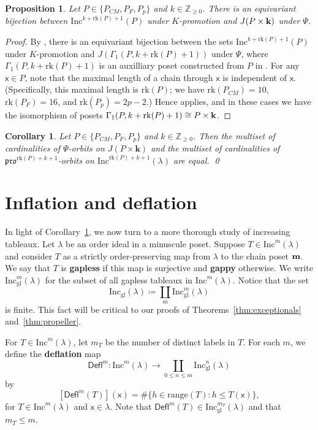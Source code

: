\documentclass[12pt]{amsart}
\newcommand{\x}{\ensuremath{\mathsf{x}}}
\newtheorem{proposition}[theorem]{Proposition}
\newtheorem{corollary}[theorem]{Corollary}
\theoremstyle{definition}
\theoremstyle{remark}
\numberwithin{equation}{section}
\newcommand{\inc}{\ensuremath{\mathrm{Inc}}}
\newcommand{\incgl}{\inc_{\mathrm{gl}}}
\newcommand{\pro}{\mathfrak{pro}}
\newcommand{\rank}{\ensuremath{\mathrm{rk}}}
\newcommand{\deflate}{\ensuremath{\mathsf{Defl}}}
\begin{document}
\begin{proposition}
Let $P \in \{ P_{CM}, P_F, P_p \}$ and $k \in \mathbb{Z}_{\geq 0}$.
There is an equivariant bijection between $\inc^{k+\rank(P)+1}(P)$ under $K$-promotion and $J(P \times {\bf k})$ under $\Psi$.
\end{proposition}
\begin{proof}
By \cite[Corollary~5.2]{Dilks.Striker.Vorland}, there is an equivariant bijection between the sets $\inc^{k+\rank(P)+1}(P)$ under $K$-promotion and $J(\Gamma_1(P,k+\rank(P)+1))$  under $\Psi$, where $\Gamma_1(P,k+\rank(P)+1)$ is an auxilliary poset constructed from $P$ in \cite[]{Dilks.Striker.Vorland}.
For any $\x \in P$, note that the maximal length of a chain through $\x$ is independent of $\x$. (Specifically, this maximal length is $\rank(P)$; we have $\rank(P_{CM}) = 10$, $\rank(P_F)= 16$, and $\rank(P_p) = 2p-2$.)
Hence \cite[Corollary~3.28]{Dilks.Striker.Vorland} applies, and in these cases we have the isomorphism of posets $\Gamma_1(P,k+\rank(P)+1) \cong P \times {\bf k}$.
\end{proof}

\begin{corollary}\label{cor:multisets}
Let $P \in \{ P_{CM}, P_F, P_p \}$ and $k \in \mathbb{Z}_{\geq 0}$.
Then the multiset of cardinalities of $\Psi$-orbits on $J(P \times \mathbf{k})$ and the multiset of cardinalities of $\pro^{\rank(P)+ k+1}$-orbits on $\inc^{\rank(P)+ k+1}(\lambda)$ are equal. \qed
\end{corollary}


\section{Inflation and deflation}\label{sec:inflation}
In light of Corollary~\ref{cor:multisets}, we now turn to a more thorough study of increasing tableaux. Let $\lambda$ be an order ideal in a minuscule poset.
Suppose $T \in \inc^m(\lambda)$ and consider $T$ as a strictly order-preserving map from $\lambda$ to the chain poset ${\bf m}$. We say that $T$ is {\bf gapless} if this map is surjective and {\bf gappy} otherwise. We write $\incgl^m(\lambda)$ for the subset of all gapless tableaux in $\inc^m(\lambda)$. Notice that the set 
\[
\incgl(\lambda) \coloneqq \coprod_{m} \incgl^m(\lambda)
\]
is finite. This fact will be critical to our proofs of Theorems~\ref{thm:exceptionals} and~\ref{thm:propeller}.

For $T \in \inc^m(\lambda)$, let $m_T$ be the number of distinct labels in $T$. For each $m$, we define the {\bf deflation} map \[\deflate^m : \inc^m(\lambda) \to \coprod_{0 \leq n \leq m} \incgl^n(\lambda)\] by
\[
[\deflate^m(T)](\x) =
\# \{ h \in \mathrm{range}(T): h \leq T(\x) \} ,
\]
for $T \in \inc^m(\lambda)$ and $\x \in \lambda$. Note that $\deflate^m(T) \in \incgl^{m_T}(\lambda)$ and that $m_T \leq m$.
\end{document}
